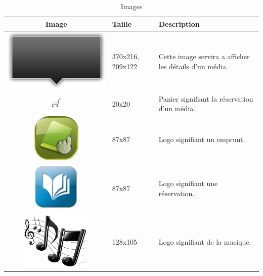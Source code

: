 \documentclass[letter, 11pt]{report}
\begin{document}
\begin{table}[ht]
	\caption{Images}
	\begin{center}
		\begin{tabular}{|c|l|l|}
		\hline
		Image                                            & Taille           & Description \\ \hline
		\includegraphics[scale=0.2]{black_arrow_big.png} & 370x216, 209x122 & Cette image servira a afficher les détails d'un média. \\ \hline
		\includegraphics{cart.png}                       & 20x20            & Panier signifiant la réservation d'un média. \\ \hline
		\includegraphics[scale=1.15]{emprunt.png}        & 87x87            & Logo signifiant un emprunt. \\ \hline
		\includegraphics[scale=0.3]{reservation.png}     & 87x87            & Logo signifiant une réservation. \\ \hline
		\includegraphics[scale=0.3]{musique.png}         & 128x105          & Logo signifiant de la musique. \\ \hline

\end{tabular}
\end{center}
\end{table}
\end{document}
